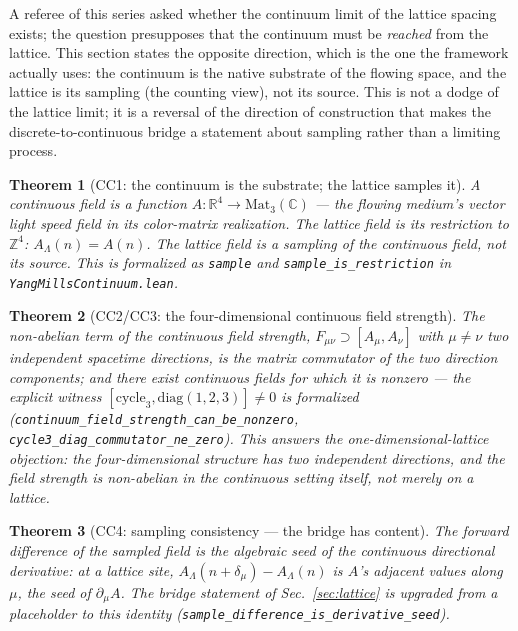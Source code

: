 \documentclass[aps,prd,preprint,superscriptaddress,amsmath,amssymb]{revtex4-2}
\newtheorem{theorem}{Theorem}[section]
\begin{document}
A referee of this series asked whether the continuum limit of the
lattice spacing exists; the question presupposes that the continuum
must be \emph{reached} from the lattice.  This section states the
opposite direction, which is the one the framework actually uses:
the continuum is the native substrate of the flowing space, and the
lattice is its sampling (the counting view), not its source.  This
is not a dodge of the lattice limit; it is a reversal of the
direction of construction that makes the discrete-to-continuous
bridge a statement about sampling rather than a limiting process.

\begin{theorem}[CC1: the continuum is the substrate; the lattice samples it]
\label{thm:cc1}
A continuous field is a function $A: \mathbb{R}^4\to
\mathrm{Mat}_3(\mathbb{C})$ --- the flowing medium's vector light
speed field in its color-matrix realization.  The lattice field is
its restriction to $\mathbb{Z}^4$: $A_\Lambda(n)=A(n)$.  The lattice
field is a sampling of the continuous field, not its source.  This
is formalized as \texttt{sample} and \texttt{sample\_is\_restriction}
in \texttt{YangMillsContinuum.lean}.
\end{theorem}

\begin{theorem}[CC2/CC3: the four-dimensional continuous field strength]
\label{thm:cc2}
The non-abelian term of the continuous field strength,
$F_{\mu\nu}\supset [A_\mu,A_\nu]$ with $\mu\neq\nu$ two independent
spacetime directions, is the matrix commutator of the two direction
components; and there exist continuous fields for which it is
nonzero --- the explicit witness
$[\mathrm{cycle}_3,\mathrm{diag}(1,2,3)]\neq0$ is formalized
(\texttt{continuum\_field\_strength\_can\_be\_nonzero},
\texttt{cycle3\_diag\_commutator\_ne\_zero}).  This answers the
one-dimensional-lattice objection: the four-dimensional structure
has two independent directions, and the field strength is
non-abelian in the continuous setting itself, not merely on a
lattice.
\end{theorem}

\begin{theorem}[CC4: sampling consistency --- the bridge has content]
\label{thm:cc4}
The forward difference of the sampled field is the algebraic seed of
the continuous directional derivative: at a lattice site,
$A_\Lambda(n+\delta_\mu)-A_\Lambda(n)$ is $A$'s adjacent values
along $\mu$, the seed of $\partial_\mu A$.  The bridge statement of
Sec.~\ref{sec:lattice} is upgraded from a placeholder to this
identity (\texttt{sample\_difference\_is\_derivative\_seed}).
\end{theorem}
\end{document}
